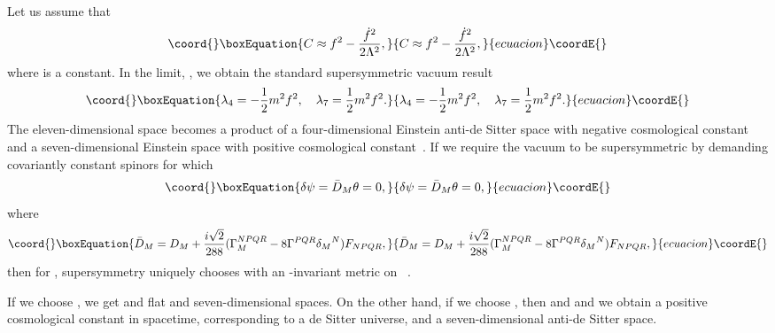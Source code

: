 \documentclass[a4paper,12pt]{article}
\begin{document}
Let us assume that
\begin{equation}\coord{}\boxEquation{
\label{Cconstant}
C\approx f^2-\frac{{\dot f}^2}{2\Lambda^2},
}{
C\approx f^2-\frac{{\dot f}^2}{2\Lambda^2},
}{ecuacion}\coordE{}\end{equation}
where \coordHE{} is a constant. In the
limit, \myHighlight{$\Lambda\rightarrow\infty$}\coordHE{}, we obtain the standard supersymmetric
vacuum result
\begin{equation}\coord{}\boxEquation{
\lambda_4=-\frac{1}{2}m^2f^2,\quad \lambda_7=\frac{1}{2}m^2f^2.
}{
\lambda_4=-\frac{1}{2}m^2f^2,\quad \lambda_7=\frac{1}{2}m^2f^2.
}{ecuacion}\coordE{}\end{equation}
The eleven-dimensional space becomes a product of a four-dimensional
Einstein anti-de Sitter space with negative
cosmological constant and a seven-dimensional Einstein space with positive
cosmological constant~\cite{Duff}.
If we require the vacuum to be supersymmetric by
demanding covariantly constant spinors \myHighlight{$\theta$}\coordHE{} for which
\begin{equation}\coord{}\boxEquation{
\delta\psi={\bar D}_M\theta=0,
}{
\delta\psi={\bar D}_M\theta=0,
}{ecuacion}\coordE{}\end{equation}
where
\begin{equation}\coord{}\boxEquation{
{\bar D}_M=D_M+\frac{i\sqrt{2}}{288}(\Gamma^{NPQR}_M-8\Gamma^{PQR}
{\delta_M}^N)F_{NPQR},
}{
{\bar D}_M=D_M+\frac{i\sqrt{2}}{288}(\Gamma^{NPQR}_M-8\Gamma^{PQR}
{\delta_M}^N)F_{NPQR},
}{ecuacion}\coordE{}\end{equation}
then for \coordHE{}, \coordHE{} supersymmetry uniquely chooses \coordHE{}
with an \coordHE{}-invariant metric on \coordHE{}~\cite{Duff,Englert}.

If we choose \coordHE{}, we
get \coordHE{} and flat \coordHE{} and
seven-dimensional spaces. On the other hand, if we choose
\coordHE{}, then \coordHE{} and \coordHE{} and
we obtain a positive cosmological constant in \coordHE{} spacetime,
corresponding to a de Sitter universe, and a seven-dimensional anti-de
Sitter space.
\end{document}
